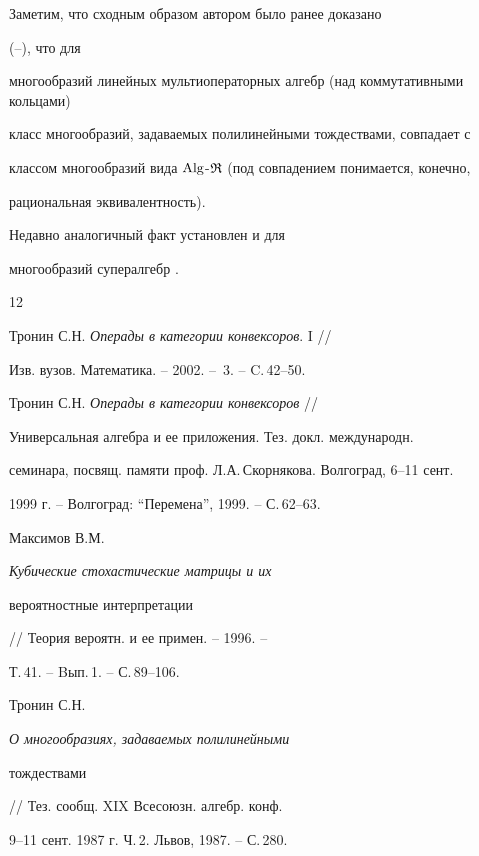 Заметим, что сходным образом автором было ранее доказано


(\cite{T1}--\cite{T}), что для


многообразий линейных мультиоператорных алгебр (над коммутативными кольцами)


класс многообразий, задаваемых полилинейными тождествами, совпадает с


классом многообразий вида $\operatorname{Alg}$-$\frak R$ (под совпадением понимается, конечно,


рациональная эквивалентность).


Недавно аналогичный факт установлен и для


многообразий супералгебр \cite{T5}.





\begin{thebibliography}{12}





 Тронин С.Н. {\em Операды в категории конвексоров}. I //


Изв. вузов. Математика. -- 2002. -- \No\,3. -- C.\,42--50.





 Тронин С.Н. {\em Операды в категории конвексоров} //


Универсальная алгебра и ее приложения. Тез. докл. международн.


семинара, посвящ. памяти проф. Л.А.\,Скорнякова. Волгоград, 6--11 сент.


1999 г. -- Волгоград: ``Перемена'', 1999. -- С.\,62--63.





 Максимов В.М. {\em Кубические стохастические матрицы и их


вероятностные интерпретации} // Теория вероятн. и ее примен. -- 1996. --


Т.\,41. -- Bып.\,1. -- С.\,89--106.





 Тронин С.Н. {\em О многообразиях, задаваемых полилинейными


тождествами} // Тез. сообщ. XIX Всесоюзн. алгебр. конф. 


9--11 сент. 1987 г. Ч.\,2. Львов, 1987. -- С.\,280.






\end{thebibliography}

